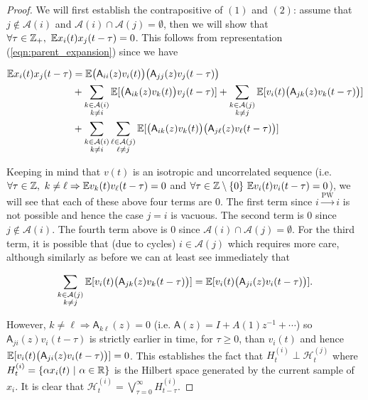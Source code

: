 \documentclass[12pt]{article}
\def\pwgc{\overset{\text{PW}}{\rightarrow}}  %
\def\A{\mathsf{A}}  %
\def\H{\mathcal{H}}  %
\newcommand{\anc}[1]{\mathcal{A}(#1)}  %
\begin{document}
\begin{proof}
  We will first establish the contrapositive of $(1)$ and $(2)$: assume that $j \not \in \anc{i}$ and $\anc{i} \cap \anc{j} = \emptyset$, then we will show that $\forall \tau \in \mathbb{Z}_+,\ \mathbb{E} x_i(t)x_j(t - \tau) = 0$.  This follows from representation (\ref{eqn:parent_expansion}) since we have

  \begin{align*}
    \E x_i(t)x_j(t - \tau) &= \E \big(\A_{ii}(z)v_i(t)\big)\big(\A_{jj}(z)v_j(t - \tau)\big)\\
    &+ \sum_{\substack{k \in \anc{i} \\ k \ne i}}\E[\big(\A_{ik}(z)v_k(t)\big)v_j(t - \tau)] + \sum_{\substack{k \in \anc{j} \\ k \ne j}}\E[v_i(t) \big(\A_{jk}(z) v_k(t - \tau)\big)]\\
    &+ \sum_{\substack{k \in \anc{i} \\ k \ne i}}\sum_{\substack{\ell \in \anc{j} \\ \ell \ne j}}\E[\big(\A_{ik}(z)v_k(t)\big)\big(\A_{j\ell}(z)v_\ell(t - \tau)\big)]\\
  \end{align*}

  Keeping in mind that $v(t)$ is an isotropic and uncorrelated sequence (i.e. $\forall \tau \in \mathbb{Z},\ k \ne \ell \Rightarrow \mathbb{E} v_k(t)v_\ell(t - \tau) = 0$ and $\forall \tau \in \mathbb{Z}\setminus\{0\}\ \mathbb{E} v_i(t)v_i(t - \tau) = 0$), we will see that each of these above four terms are 0.  The first term since $i \pwgc i$ is not possible and hence the case $j = i$ is vacuous.  The second term is 0 since $j \not\in \anc{i}$.  The fourth term above is 0 since $\anc{i} \cap \anc{j} = \emptyset$.  For the third term, it is possible that (due to cycles) $i \in \anc{j}$ which requires more care, although similarly as before we can at least see immediately that

  \begin{equation*}
    \sum_{\substack{k \in \anc{j} \\ k \ne j}}\E[v_i(t) \big(\A_{jk}(z) v_k(t - \tau)\big)] = \E[v_i(t)\big(\A_{ji}(z)v_i(t - \tau)\big)].
  \end{equation*}

  However, $k \ne \ell \Rightarrow \A_{k\ell}(z) = 0$ (i.e. $\A(z) = I + A(1)z^{-1} + \cdots$) so $\A_{ji}(z)v_i(t - \tau)$ is strictly earlier in time, for $\tau \ge 0$, than $v_i(t)$ and hence $\E[v_i(t)\big(\A_{ji}(z)v_i(t - \tau)\big)] = 0$.  This establishes the fact that $H_t^{(i)} \perp \H_t^{(j)}$ where $H_t^{(i)} = \{\alpha x_i(t)\ |\ \alpha \in \mathbb{R}\}$ is the Hilbert space generated by the current sample of $x_i$.  It is clear that $\H_t^{(i)} = \bigvee_{\tau = 0}^\infty H_{t - \tau}^{(i)}$.


\end{proof}
\end{document}
